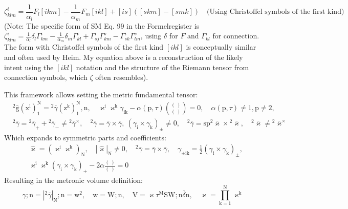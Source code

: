 \documentclass[12pt]{article}
\begin{document}
\begin{itemize}
\begin{enumerate}
\begin{equation}
        \zeta^i_{klm} = \frac{1}{\alpha_l} F_l [ikm] - \frac{1}{\alpha_m} F_m [ikl] + [is]([skm] - [smk]) \quad \text{(Using Christoffel symbols of the first kind)}
        \label{eq:original_strukturkompressor_def}
        \end{equation}
        (Note: The specific form of SM Eq. 99 in the Formelregister is \( \zeta^i_{klm} = \frac{1}{\alpha_l} \delta_l \Gamma^i_{km} - \frac{1}{\alpha_m} \delta_m \Gamma^i_{kl} + \Gamma^i_{sj}\Gamma^s_{km} - \Gamma^i_{sk}\Gamma^s_{lm} \), using \( \delta \) for \(F\) and \( \Gamma^i_{kl} \) for connection. The form with Christoffel symbols of the first kind \( [ikl] \) is conceptually similar and often used by Heim. My equation above is a reconstruction of the likely intent using the \( [ikl] \) notation and the structure of the Riemann tensor from connection symbols, which \( \zeta \) often resembles).
    \end{enumerate}
    This framework allows setting the metric fundamental tensor:
    \begin{equation}
    \begin{aligned}
    & {}^2\bar{\mathrm{g}}(\mathrm{x^l})_1^\mathrm{N} = {}^2\bar{\gamma}(\mathrm{z^k})_1^\mathrm{N}, \mathrm{n}, \quad \varkappa^\mathrm{i}\varkappa^\mathrm{k}\gamma_{\mathrm{ik}} - \alpha(\mathrm{p},\tau)\binom{(\ )}{(\ )} = 0, \quad \alpha(\mathrm{p},\tau) \neq 1, \mathrm{p} \neq 2, \\
    & {}^2\bar{\gamma} = {}^2\bar{\gamma}_+ + {}^2\bar{\gamma}_- \neq {}^2\bar{\gamma}^\times, \quad {}^2\bar{\gamma} = \bar{\gamma} \times \bar{\gamma}, \ (\gamma_{\mathrm{i}} \times \gamma_{\mathrm{k}})_\pm \neq 0, \quad {}^2\bar{\gamma} = \mathrm{sp} {}^2\bar{\varkappa} \times {}^2\bar{\varkappa}, \quad {}^2\bar{\varkappa} \neq {}^2\bar{\varkappa}^\times
    \end{aligned} \tag{84}
    \end{equation}
    Which expands to symmetric parts and coefficients:
    \begin{equation}
    \begin{aligned}
    & \hat{\varkappa} = (\varkappa^\mathrm{i}\varkappa^\mathrm{k})_\mathrm{N}, \quad |\hat{\varkappa}|_\mathrm{N} \neq 0, \quad {}^2\bar{\gamma} = \bar{\gamma} \times \bar{\gamma}, \quad \gamma_{\pm\mathrm{ik}} = \frac{1}{2}(\gamma_{\mathrm{i}} \times \gamma_{\mathrm{k}})_\pm, \\
    & \varkappa^\mathrm{i}\varkappa^\mathrm{k}(\gamma_{\mathrm{i}} \times \gamma_{\mathrm{k}})_+ - 2\alpha \frac{(\ )}{(\ )} = 0
    \end{aligned} \tag{84a}
    \end{equation}
    Resulting in the metronic volume definition:
    \begin{equation}
    \gamma; \mathrm{n} = |{}^2\bar{\gamma}|_\mathrm{N}; \mathrm{n} = \mathrm{w}^2, \quad \mathrm{w} = \mathrm{W}; \mathrm{n}, \quad \mathrm{V} = \varkappa \tau^\mathrm{M} \mathrm{S}\mathrm{W}; \mathrm{n} \bar{\delta}\mathrm{n}, \quad \varkappa = \prod_{\mathrm{k}=1}^\mathrm{N} \varkappa^\mathrm{k} \tag{85}
    \end{equation}


\end{itemize}
\end{document}
